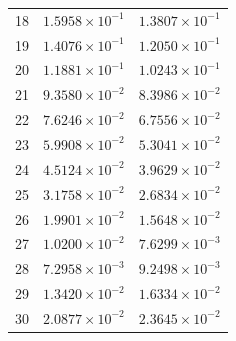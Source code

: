 \begin{table}[H]
\begin{tabular}{@{}rrr@{}}
18 & $1.5958\times10^{-1}$ & $1.3807\times10^{-1}$\\
19 & $1.4076\times10^{-1}$ & $1.2050\times10^{-1}$\\
20 & $1.1881\times10^{-1}$ & $1.0243\times10^{-1}$\\
21 & $9.3580\times10^{-2}$ & $8.3986\times10^{-2}$\\
22 & $7.6246\times10^{-2}$ & $6.7556\times10^{-2}$\\
23 & $5.9908\times10^{-2}$ & $5.3041\times10^{-2}$\\
24 & $4.5124\times10^{-2}$ & $3.9629\times10^{-2}$\\
25 & $3.1758\times10^{-2}$ & $2.6834\times10^{-2}$\\
26 & $1.9901\times10^{-2}$ & $1.5648\times10^{-2}$\\
27 & $1.0200\times10^{-2}$ & $7.6299\times10^{-3}$\\
28 & $7.2958\times10^{-3}$ & $9.2498\times10^{-3}$\\
29 & $1.3420\times10^{-2}$ & $1.6334\times10^{-2}$\\
30 & $2.0877\times10^{-2}$ & $2.3645\times10^{-2}$\\
\bottomrule
\end{tabular}
\end{table}

